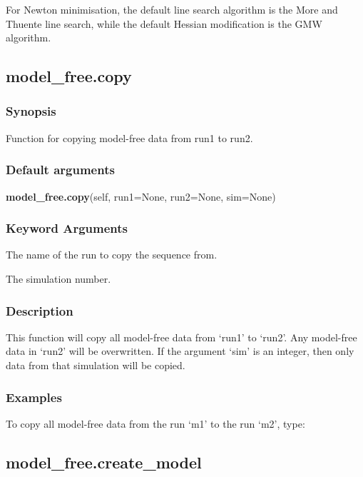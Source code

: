 For Newton minimisation, the default line search algorithm is the More and Thuente line search,
while the default Hessian modification is the GMW algorithm.


\newpage

\subsection{model\_free.copy}


\subsubsection{Synopsis}

Function for copying model-free data from run1 to run2.

\subsubsection{Default arguments}

\textsf{\textbf{model\_free.copy}(self, run1=None, run2=None, sim=None)}


\subsubsection{Keyword Arguments}

  The name of the run to copy the sequence from.

  The simulation number.

\subsubsection{Description}

This function will copy all model-free data from `run1' to `run2'.  Any model-free data in
`run2' will be overwritten.  If the argument `sim' is an integer, then only data from that
simulation will be copied.


\subsubsection{Examples}

To copy all model-free data from the run `m1' to the run `m2', type:




\newpage

\subsection{model\_free.create\_model}


